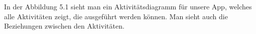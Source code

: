 In der Abbildung 5.1 sieht man ein Aktivitätsdiagramm für unsere App, welches alle Aktivitäten zeigt, die ausgeführt werden können. Man sieht auch die Beziehungen zwischen den Aktivitäten.